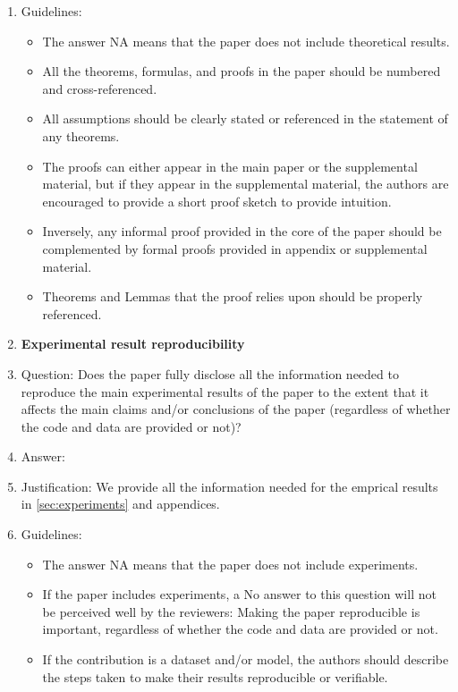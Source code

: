 \documentclass{article}
\begin{document}
\begin{enumerate}
    \item[] Guidelines:
    \begin{itemize}
        \item The answer NA means that the paper does not include theoretical results.
        \item All the theorems, formulas, and proofs in the paper should be numbered and cross-referenced.
        \item All assumptions should be clearly stated or referenced in the statement of any theorems.
        \item The proofs can either appear in the main paper or the supplemental material, but if they appear in the supplemental material, the authors are encouraged to provide a short proof sketch to provide intuition.
        \item Inversely, any informal proof provided in the core of the paper should be complemented by formal proofs provided in appendix or supplemental material.
        \item Theorems and Lemmas that the proof relies upon should be properly referenced.
    \end{itemize}
    \item {\bf Experimental result reproducibility}
    \item[] Question: Does the paper fully disclose all the information needed to reproduce the main experimental results of the paper to the extent that it affects the main claims and/or conclusions of the paper (regardless of whether the code and data are provided or not)?
    \item[] Answer: \answerYes{}
    \item[] Justification: We provide all the information needed for the emprical results in \cref{sec:experiments} and appendices.
    \item[] Guidelines:
    \begin{itemize}
        \item The answer NA means that the paper does not include experiments.
        \item If the paper includes experiments, a No answer to this question will not be perceived well by the reviewers: Making the paper reproducible is important, regardless of whether the code and data are provided or not.
        \item If the contribution is a dataset and/or model, the authors should describe the steps taken to make their results reproducible or verifiable.

\end{itemize}
\end{enumerate}
\end{document}
